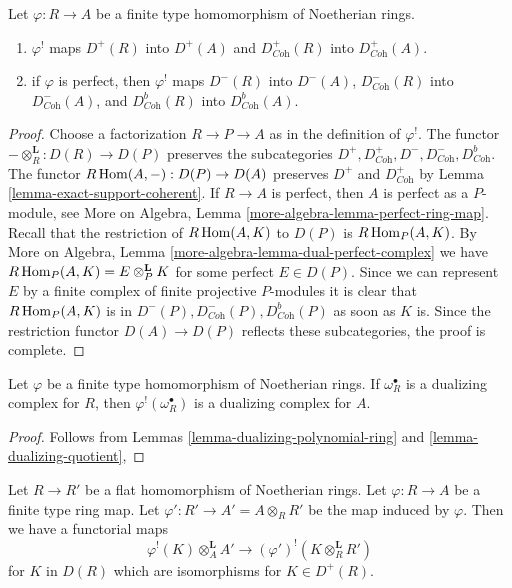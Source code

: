 \begin{lemma}
\label{lemma-shriek-boundedness}
Let $\varphi : R \to A$ be a finite type homomorphism of Noetherian rings.
\begin{enumerate}
\item $\varphi^!$ maps $D^+(R)$ into $D^+(A)$ and
$D^+_{\textit{Coh}}(R)$ into $D^+_{\textit{Coh}}(A)$.
\item if $\varphi$ is perfect, then $\varphi^!$ maps
$D^-(R)$ into $D^-(A)$,
$D^-_{\textit{Coh}}(R)$ into $D^-_{\textit{Coh}}(A)$, and
$D^b_{\textit{Coh}}(R)$ into $D^b_{\textit{Coh}}(A)$.
\end{enumerate}
\end{lemma}

\begin{proof}
Choose a factorization $R \to P \to A$ as in the definition of $\varphi^!$.
The functor $- \otimes_R^\mathbf{L} : D(R) \to D(P)$ preserves
the subcategories
$D^+, D^+_{\textit{Coh}}, D^-, D^-_{\textit{Coh}}, D^b_{\textit{Coh}}$.
The functor $R\mathop{\mathrm{Hom}}\nolimits(A, -) : D(P) \to D(A)$
preserves $D^+$ and $D^+_{\textit{Coh}}$ by
Lemma \ref{lemma-exact-support-coherent}.
If $R \to A$ is perfect, then $A$ is perfect as a $P$-module, see
More on Algebra, Lemma \ref{more-algebra-lemma-perfect-ring-map}.
Recall that the restriction of $R\mathop{\mathrm{Hom}}\nolimits(A, K)$ to $D(P)$ is
$R\mathop{\mathrm{Hom}}\nolimits_P(A, K)$. By More on Algebra, Lemma
\ref{more-algebra-lemma-dual-perfect-complex}
we have $R\mathop{\mathrm{Hom}}\nolimits_P(A, K) = E \otimes_P^\mathbf{L} K$ for
some perfect $E \in D(P)$. Since we can represent $E$ by
a finite complex of finite projective $P$-modules
it is clear that $R\mathop{\mathrm{Hom}}\nolimits_P(A, K)$ is in
$D^-(P), D^-_{\textit{Coh}}(P), D^b_{\textit{Coh}}(P)$
as soon as $K$ is. Since the restriction functor
$D(A) \to D(P)$ reflects these subcategories, the
proof is complete.
\end{proof}

\begin{lemma}
\label{lemma-shriek-dualizing-algebraic}
Let $\varphi$ be a finite type homomorphism of Noetherian rings.
If $\omega_R^\bullet$ is a dualizing complex for $R$, then
$\varphi^!(\omega_R^\bullet)$ is a dualizing complex for $A$.
\end{lemma}

\begin{proof}
Follows from Lemmas
\ref{lemma-dualizing-polynomial-ring} and
\ref{lemma-dualizing-quotient},
\end{proof}

\begin{lemma}
\label{lemma-flat-bc}
Let $R \to R'$ be a flat homomorphism of Noetherian rings.
Let $\varphi : R \to A$ be a finite type ring map.
Let $\varphi' : R' \to A' = A \otimes_R R'$ be the map induced by $\varphi$.
Then we have a functorial maps
$$
\varphi^!(K) \otimes_A^\mathbf{L} A' \longrightarrow
(\varphi')^!(K \otimes_R^\mathbf{L} R')
$$
for $K$ in $D(R)$ which are isomorphisms for $K \in D^+(R)$.
\end{lemma}

